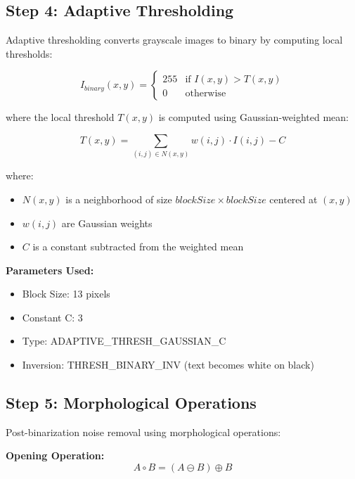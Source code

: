 \documentclass[12pt,a4paper,oneside]{report}
\begin{document}
\subsection{Step 4: Adaptive Thresholding}

Adaptive thresholding converts grayscale images to binary by computing local thresholds:

\begin{equation}
    I_{binary}(x, y) = 
    \begin{cases}
        255 & \text{if } I(x, y) > T(x, y) \\
        0 & \text{otherwise}
    \end{cases}
\end{equation}

where the local threshold $T(x, y)$ is computed using Gaussian-weighted mean:

\begin{equation}
    T(x, y) = \sum_{(i,j) \in N(x,y)} w(i, j) \cdot I(i, j) - C
\end{equation}

where:
\begin{itemize}
    \item $N(x, y)$ is a neighborhood of size $blockSize \times blockSize$ centered at $(x, y)$
    \item $w(i, j)$ are Gaussian weights
    \item $C$ is a constant subtracted from the weighted mean
\end{itemize}

\textbf{Parameters Used:}
\begin{itemize}
    \item Block Size: 13 pixels
    \item Constant C: 3
    \item Type: ADAPTIVE\_THRESH\_GAUSSIAN\_C
    \item Inversion: THRESH\_BINARY\_INV (text becomes white on black)
\end{itemize}

\subsection{Step 5: Morphological Operations}

Post-binarization noise removal using morphological operations:

\textbf{Opening Operation:}
\begin{equation}
    A \circ B = (A \ominus B) \oplus B
\end{equation}
\end{document}
